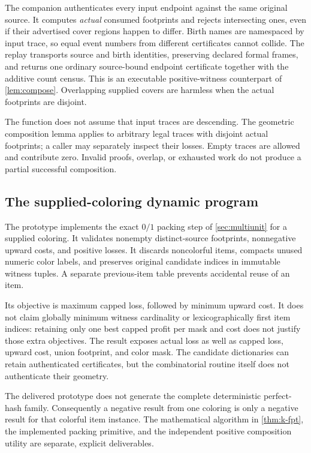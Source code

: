 The companion  authenticates every input
endpoint against the same original source. It computes \emph{actual}
consumed footprints and rejects intersecting ones, even if their advertised
cover regions happen to differ. Birth names are namespaced by input trace,
so equal event numbers from different certificates cannot collide. The
replay transports source and birth identities, preserving declared formal
frames, and returns one ordinary source-bound endpoint certificate together
with the additive count census. This is an executable positive-witness
counterpart of \cref{lem:compose}. Overlapping supplied covers are harmless
when the actual footprints are disjoint.

The function does not assume that input traces are descending. The geometric
composition lemma applies to arbitrary legal traces with disjoint actual
footprints; a caller may separately inspect their losses. Empty traces are
allowed and contribute zero. Invalid proofs, overlap, or exhausted work
do not produce a partial successful composition.

\subsection{The supplied-coloring dynamic program}

The prototype  implements the
exact $0/1$ packing step of \cref{sec:multiunit} for a supplied coloring.
It validates nonempty distinct-source footprints, nonnegative upward costs,
and positive losses. It discards noncolorful items, compacts unused numeric
color labels, and preserves original candidate indices in immutable witness
tuples. A separate previous-item table prevents accidental reuse of an item.

Its objective is maximum capped loss, followed by minimum upward cost.
It does not claim globally minimum witness cardinality or lexicographically
first item indices: retaining only one best capped profit per mask and
cost does not justify those extra objectives. The result exposes actual
loss as well as capped loss, upward cost, union footprint, and color mask.
The candidate dictionaries can retain authenticated certificates, but the
combinatorial routine itself does not authenticate their geometry.

The delivered prototype does not generate the complete deterministic
perfect-hash family. Consequently a negative result from one coloring
is only a negative result for that colorful item instance. The mathematical
algorithm in \cref{thm:k-fpt}, the implemented packing primitive, and the
independent positive composition utility are separate, explicit deliverables.

